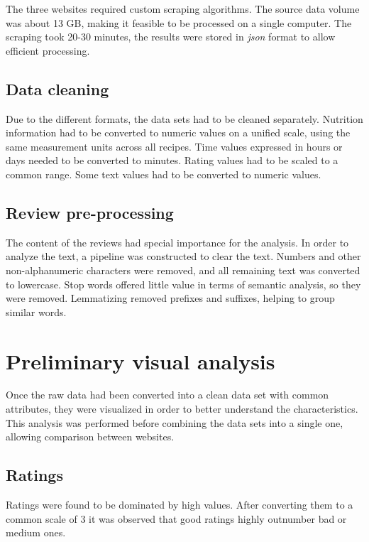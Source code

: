 \documentclass[11pt]{article}
\begin{document}
The three websites required custom scraping algorithms. The source data volume was about 13 GB, making it feasible to be processed on a single computer. The scraping took 20-30 minutes, the results were stored in \textit{json} format to allow efficient processing.

\subsection{Data cleaning}

Due to the different formats, the data sets had to be cleaned separately. Nutrition information had to be converted to numeric values on a unified scale, using the same measurement units across all recipes. Time values expressed in hours or days needed to be converted to minutes. Rating values had to be scaled to a common range. Some text values had to be converted to numeric values.

\subsection{Review pre-processing}

The content of the reviews had special importance for the analysis. In order to analyze the text, a pipeline was constructed to clear the text. Numbers and other non-alphanumeric characters were removed, and all remaining text was converted to lowercase. Stop words offered little value in terms of semantic analysis, so they were removed. Lemmatizing removed prefixes and suffixes, helping to group similar words.

\section{Preliminary visual analysis}

Once the raw data had been converted into a clean data set with common attributes, they were visualized in order to better understand the characteristics. This analysis was performed before combining the data sets into a single one, allowing comparison between websites.

\subsection{Ratings}

Ratings were found to be dominated by high values. After converting them to a common scale of 3 it was observed that good ratings highly outnumber bad or medium ones.
\end{document}

